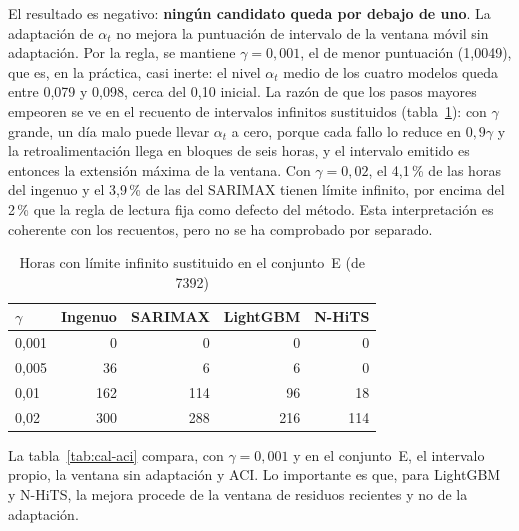El resultado es negativo: \textbf{ningún candidato queda por debajo de uno}. La
adaptación de $\alpha_t$ no mejora la puntuación de intervalo de la ventana móvil
sin adaptación. Por la regla, se mantiene $\gamma = 0{,}001$, el de menor
puntuación (1,0049), que es, en la práctica, casi inerte: el nivel $\alpha_t$ medio
de los cuatro modelos queda entre 0,079 y 0,098, cerca del 0,10 inicial. La
razón de que los pasos mayores empeoren se ve en el recuento de intervalos
infinitos sustituidos (tabla~\ref{tab:cal-infinitos}): con $\gamma$ grande, un
día malo puede llevar $\alpha_t$ a cero, porque cada fallo lo reduce en
$0{,}9\gamma$ y la retroalimentación llega en bloques de seis horas, y el
intervalo emitido es entonces la extensión máxima de la ventana. Con
$\gamma = 0{,}02$, el 4,1\,\% de las horas del ingenuo y el 3,9\,\% de las del
SARIMAX tienen límite infinito, por encima del 2\,\% que la regla de lectura
fija como defecto del método. Esta interpretación es coherente con los
recuentos, pero no se ha comprobado por separado.

\begin{table}[htbp]
	\centering
	\caption{Horas con límite infinito sustituido en el conjunto~E (de 7392)}
	\label{tab:cal-infinitos}
	\small
	\begin{tabular}{lrrrr}
		\hline
		$\gamma$ & \textbf{Ingenuo} & \textbf{SARIMAX} & \textbf{LightGBM} & \textbf{N-HiTS} \\
		\hline
		0,001 & 0 & 0 & 0 & 0 \\
		0,005 & 36 & 6 & 6 & 0 \\
		0,01 & 162 & 114 & 96 & 18 \\
		0,02 & 300 & 288 & 216 & 114 \\
		\hline
	\end{tabular}
\end{table}

La tabla~\ref{tab:cal-aci} compara, con $\gamma = 0{,}001$ y en el
conjunto~E, el intervalo propio, la ventana sin adaptación y ACI. Lo
importante es que, para LightGBM y N-HiTS, la mejora procede de la ventana de
residuos recientes y no de la adaptación.

